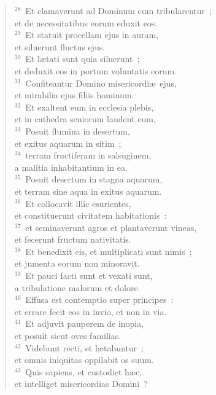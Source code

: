 \begin{verse}
${}^{28}$~Et clamaverunt ad Dominum cum tribularentur~;\\ et de necessitatibus eorum eduxit eos.\\
${}^{29}$~Et statuit procellam ejus in auram,\\ et siluerunt fluctus ejus.\\
${}^{30}$~Et l\ae tati sunt quia siluerunt~;\\ et deduxit eos in portum voluntatis eorum.\\
${}^{31}$~Confiteantur Domino misericordi\ae\ ejus,\\ et mirabilia ejus filiis hominum.\\
${}^{32}$~Et exaltent eum in ecclesia plebis,\\ et in cathedra seniorum laudent eum.\\
${}^{33}$~Posuit flumina in desertum,\\ et exitus aquarum in sitim~;\\
${}^{34}$~terram fructiferam in salsuginem,\\ a malitia inhabitantium in ea.\\
${}^{35}$~Posuit desertum in stagna aquarum,\\ et terram sine aqua in exitus aquarum.\\
${}^{36}$~Et collocavit illic esurientes,\\ et constituerunt civitatem habitationis~:\\
${}^{37}$~et seminaverunt agros et plantaverunt vineas,\\ et fecerunt fructum nativitatis.\\
${}^{38}$~Et benedixit eis, et multiplicati sunt nimis~;\\ et jumenta eorum non minoravit.\\
${}^{39}$~Et pauci facti sunt et vexati sunt,\\ a tribulatione malorum et dolore.\\
${}^{40}$~Effusa est contemptio super principes~:\\ et errare fecit eos in invio, et non in via.\\
${}^{41}$~Et adjuvit pauperem de inopia,\\ et posuit sicut oves familias.\\
${}^{42}$~Videbunt recti, et l\ae tabuntur~;\\ et omnis iniquitas oppilabit os suum.\\
${}^{43}$~Quis sapiens, et custodiet h\ae c,\\ et intelliget misericordias Domini~?\end{verse}



